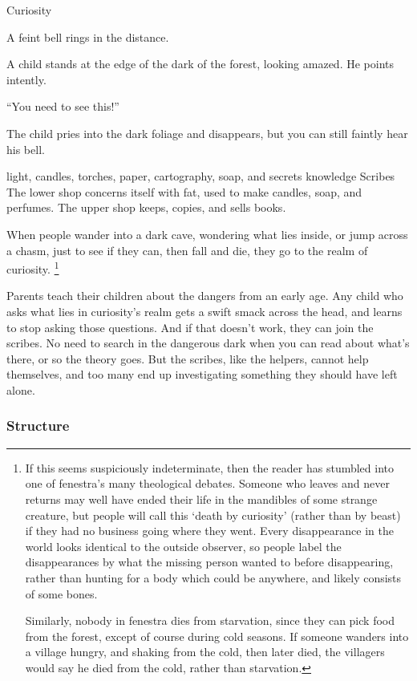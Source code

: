 \begin{multicols}{2}
  {\bell}%
  {Curiosity}%
  {
    A feint bell rings in the distance.

    A child stands at the edge of the dark of the forest, looking amazed.
    He points intently.

    {\sffamily``You need to see this!''}

    The child pries into the dark foliage and disappears, but you can still faintly hear his bell.
  }%
  {light, candles, torches, paper, cartography, soap, and secrets}%
  {knowledge}%
  {Scribes}%
  {
    The lower shop concerns itself with fat, used to make candles, soap, and perfumes.
    The upper shop keeps, copies, and sells books.
  }%

When people wander into a dark cave, wondering what lies inside, or jump across a chasm, just to see if they can, then fall and die, they go to the realm of curiosity.
\ignorespaces\footnote{If this seems suspiciously indeterminate, then the reader has stumbled into one of \gls{fenestra}'s many theological debates.
Someone who leaves and never returns may well have ended their life in the mandibles of some strange creature, but people will call this `death by curiosity' (rather than by beast) if they had no business going where they went.
Every disappearance in the world looks identical to the outside observer, so people label the disappearances by what the missing person wanted to before disappearing, rather than hunting for a body which could be anywhere, and likely consists of some bones.

Similarly, nobody in \gls{fenestra} dies from starvation, since they can pick food from the forest, except of course during cold seasons.
If someone wanders into a village hungry, and shaking from the cold, then later died, the villagers would say he died from the cold, rather than starvation.}

Parents teach their children about the dangers from an early age.
Any child who asks what lies in curiosity's realm gets a swift smack across the head, and learns to stop asking those questions.
And if that doesn't work, they can join the scribes.
No need to search in the dangerous dark when you can read about what's there, or so the theory goes.
But the scribes, like the helpers, cannot help themselves, and too many end up investigating something they should have left alone.

\subsubsection{Structure}


\end{multicols}
